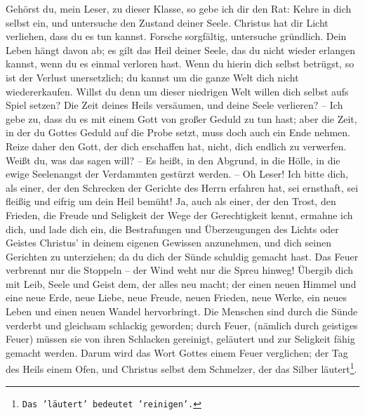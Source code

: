Gehörst du, mein Leser, zu dieser Klasse, so gebe ich dir den Rat: Kehre in dich
selbst ein, und untersuche den Zustand deiner Seele. Christus hat dir Licht
verliehen, dass du es tun kannst. Forsche sorgfältig, untersuche gründlich. Dein
Leben hängt davon ab; es gilt das Heil deiner Seele, das du nicht wieder
erlangen kannst, wenn du es einmal verloren hast. Wenn du hierin dich selbst
betrügst, so ist der Verlust unersetzlich; du kannst um die ganze Welt dich
nicht wiedererkaufen. Willst du denn um dieser niedrigen Welt willen dich selbst
aufs Spiel setzen? Die Zeit deines Heils versäumen, und deine Seele verlieren?
-- Ich gebe zu, dass du es mit einem Gott von großer Geduld zu tun hast; aber
die Zeit, in der du Gottes Geduld auf die Probe setzt, muss doch auch ein Ende
nehmen. Reize daher den Gott, der dich erschaffen hat, nicht, dich endlich zu
verwerfen. Weißt du, was das sagen will? -- Es heißt, in den Abgrund, in die
Hölle, in die ewige Seelenangst der Verdammten gestürzt werden. -- Oh Leser! Ich
bitte dich, als einer, der den Schrecken der Gerichte des Herrn erfahren hat,
sei ernsthaft, sei fleißig und eifrig um dein Heil bemüht! Ja, auch als einer,
der den Trost, den Frieden, die Freude und Seligkeit der Wege der Gerechtigkeit
kennt, ermahne ich dich, und lade dich ein, die Bestrafungen und Überzeugungen
des Lichts oder Geistes Christus' in deinem eigenen Gewissen anzunehmen, und
dich seinen Gerichten zu unterziehen; da du dich der Sünde schuldig gemacht
hast. Das Feuer verbrennt nur die Stoppeln -- der Wind weht nur die Spreu
hinweg! Übergib dich mit Leib, Seele und Geist dem, der alles neu macht; der
einen neuen Himmel und eine neue Erde, neue Liebe, neue Freude, neuen Frieden,
neue Werke, ein neues Leben und einen neuen Wandel hervorbringt. Die Menschen
sind durch die Sünde verderbt und gleichsam schlackig geworden; durch Feuer,
(nämlich durch geistiges Feuer) müssen sie von ihren Schlacken gereinigt,
geläutert und zur Seligkeit fähig gemacht werden. Darum wird das Wort Gottes
einem Feuer verglichen; der Tag des Heils einem Ofen, und Christus selbst dem
Schmelzer, der das Silber läutert\footnote{\texttt{Das 'läutert' bedeutet
'reinigen'.}}.

\medskip

